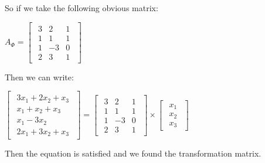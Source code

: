 \singlespacing

So if we take the following obvious matrix:

\singlespacing

\begin{math}
    A_\Phi=\begin{bmatrix}
        \begin{array}{ccc}
            3 & 2   & 1 \\
            1 & 1   & 1 \\
            1 & - 3 & 0 \\
            2 & 3   & 1
        \end{array}
    \end{bmatrix}
\end{math}

\singlespacing

Then we can write:

\singlespacing

\begin{math}
    \begin{bmatrix}
        \begin{array}{c}
            3x_1 + 2x_2 + x_3 \\
            x_1 + x_2 + x_3   \\
            x_1 - 3x_2        \\
            2x_1 + 3x_2 + x_3
        \end{array}
    \end{bmatrix} = \begin{bmatrix}
        \begin{array}{ccc}
            3 & 2   & 1 \\
            1 & 1   & 1 \\
            1 & - 3 & 0 \\
            2 & 3   & 1
        \end{array}
    \end{bmatrix} \times\begin{bmatrix}
        \begin{array}{c}
            x_1 \\
            x_2 \\
            x_3
        \end{array}
    \end{bmatrix}
\end{math}

\singlespacing

Then the equation is satisfied and we found the transformation matrix.

